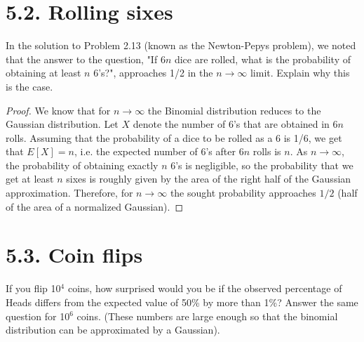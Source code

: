 \section*{5.2. Rolling sixes}
In the solution to Problem 2.13 (known as the Newton-Pepys problem), we
noted that the answer to the question, "If $6n$ dice are rolled, what is the
probability of obtaining at least $n$ 6's?", approaches 1/2 in the $n \to \infty$
limit. Explain why this is the case.

\vspace{1em}

\begin{proof}
    We know that for $n \to \infty$ the Binomial distribution reduces to the 
    Gaussian distribution. Let $X$ denote the number of 6's that are obtained 
    in $6n$ rolls. Assuming that the probability of a dice to be rolled as a 6
    is 1/6, we get that $E[X] = n$, i.e. the expected number of 6's after $6n$ 
    rolls is $n$. As $n \to \infty$, the probability
    of obtaining exactly $n$ 6's is negligible, so the probability that we 
    get at least $n$ sixes is roughly given by the area of the right half of the 
    Gaussian approximation. Therefore, for $n \to \infty$ the sought probability approaches 
    $1/2$ (half of the area of a normalized Gaussian).
\end{proof}

\section*{5.3. Coin flips}
If you flip 10$^4$ coins, how surprised would you be if the observed percentage
of Heads differs from the expected value of 50\% by more than 1\%? Answer
the same question for 10$^6$ coins. (These numbers are large enough so that
the binomial distribution can be approximated by a Gaussian).

\vspace{1em}

